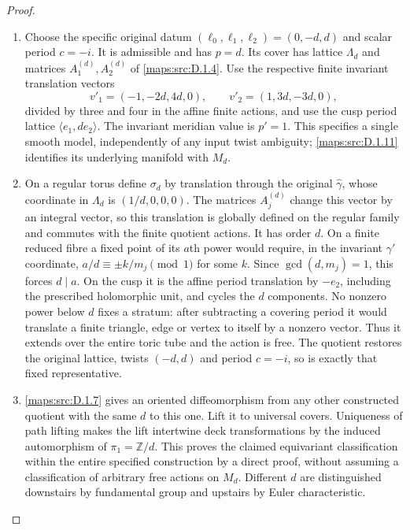 \begin{proof}
\begin{enumerate}[label=\arabic*.,leftmargin=*]
\item Choose the specific original datum
$(\ell_0,\ell_1,\ell_2)=(0,-d,d)$ and scalar period $c=-i$.
It is admissible and has $p=d$. Its cover has lattice $\Lambda_d$
and matrices $A_1^{(d)},A_2^{(d)}$ of \ref{maps:src:D.1.4}. Use the respective
finite invariant translation vectors
\[
 v'_1=(-1,-2d,4d,0),\qquad v'_2=(1,3d,-3d,0),
\]
divided by three and four in the affine finite actions, and use
the cusp period lattice $\langle e_1,d e_2\rangle$. The invariant
meridian value is $p'=1$. This specifies a single smooth model,
independently of any input twist ambiguity; \ref{maps:src:D.1.11} identifies its
underlying manifold with $M_d$.

\item On a regular torus define $\sigma_d$ by translation through the
original $\widehat\gamma$, whose coordinate in $\Lambda_d$ is
$(1/d,0,0,0)$. The matrices $A_j^{(d)}$ change this vector by an
integral vector, so this translation is globally defined on the
regular family and commutes with the finite quotient actions.
It has order $d$. On a finite reduced fibre a fixed point of its
$a$th power would require, in the invariant $\gamma'$ coordinate,
$a/d\equiv\pm k/m_j\pmod1$ for some $k$. Since $\gcd(d,m_j)=1$,
this forces $d\mid a$. On the cusp it is the affine period
translation by $-e_2$, including the prescribed holomorphic unit,
and cycles the $d$ components. No nonzero power below $d$ fixes a
stratum: after subtracting a covering period it would translate a
finite triangle, edge or vertex to itself by a nonzero vector.
Thus it extends over the entire toric tube and the action is free.
The quotient restores the original lattice, twists $(-d,d)$ and
period $c=-i$, so is exactly that fixed representative.

\item \ref{maps:src:D.1.7} gives an oriented diffeomorphism from any other constructed
quotient with the same $d$ to this one. Lift it to universal covers.
Uniqueness of path lifting makes the lift intertwine deck
transformations by the induced automorphism of $\pi_1=\mathbb Z/d$.
This proves the claimed equivariant classification within the
entire specified construction by a direct proof, without assuming
a classification of arbitrary free actions on $M_d$. Different
$d$ are distinguished downstairs by fundamental group and upstairs
by Euler characteristic.


\end{enumerate}
\end{proof}
